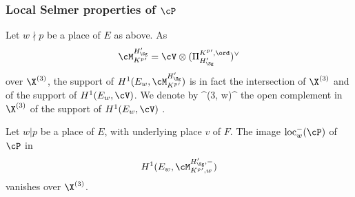 \subsubsection{Local Selmer properties  of $\cP$}  
Let $w\nmid p$ be a place of $E$ as above.
As $$  \cM_{K^{p}{}'}^{{H_{\Sg}'}}= \cV\otimes ( \Pi^{K^{p}{}', \ord}_{{H_{\Sg}'}} )^{\vee} $$ over $\X^{(3)}$, the support of $H^{1}(E_{w}, \cM_{K^{p}{}'}^{{H_{\Sg}'}}) $ is in fact the intersection of $\X^{(3)}$ and of the support of  $H^{1}(E_{w},\cV)$.
We denote by
\beq\label{open sel away from p}
\X^{(3, w)}\supset \X^{\cl}
\eeq the open complement in $\X^{(3)}$ of the support of $H^{1}(E_{w},\cV)$ .


\begin{lemm}\label{sel at p} Let $w\vert p$ be a place of $E$, with underlying place $v$ of $F$.  The
     image ${\rm loc}_{w}^{-}(\cP)$ of $\cP$ in
$$H^{1}(E_{w}, \cM_{K^{p}{}', w}^{{H_{\Sg}'}, -})$$
vanishes over $\X^{(3)}$.
\end{lemm}
